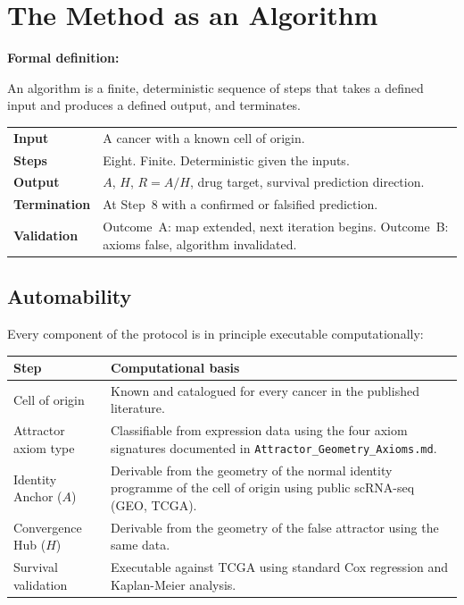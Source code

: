 \documentclass[11pt, a4paper]{article}
\begin{document}
\section{The Method as an Algorithm}

\begin{mdframed}[backgroundcolor=algorithmbox,
                 linecolor=purple!40!black,
                 linewidth=1pt]
\textbf{Formal definition:}

An algorithm is a finite, deterministic sequence of steps
that takes a defined input and produces a defined output,
and terminates.

\medskip
\begin{tabular}{p{3cm}p{10cm}}
\toprule
\textbf{Input} &
A cancer with a known cell of origin.\\[0.3em]
\textbf{Steps} &
Eight. Finite. Deterministic given the inputs.\\[0.3em]
\textbf{Output} &
$A$, $H$, $R=A/H$, drug target,
survival prediction direction.\\[0.3em]
\textbf{Termination} &
At Step~8 with a confirmed or falsified prediction.\\[0.3em]
\textbf{Validation} &
Outcome~A: map extended, next iteration begins.
Outcome~B: axioms false, algorithm invalidated.\\
\bottomrule
\end{tabular}
\end{mdframed}

\subsection{Automability}

Every component of the protocol is in principle executable
computationally:

\begin{center}
\begin{tabular}{p{4cm}p{9cm}}
\toprule
\textbf{Step} & \textbf{Computational basis} \\
\midrule
Cell of origin &
Known and catalogued for every cancer in the published
literature. \\[0.3em]
Attractor axiom type &
Classifiable from expression data using the four axiom
signatures documented in
\texttt{Attractor\_Geometry\_Axioms.md}. \\[0.3em]
Identity Anchor ($A$) &
Derivable from the geometry of the normal identity
programme of the cell of origin using public scRNA-seq
(GEO, TCGA). \\[0.3em]
Convergence Hub ($H$) &
Derivable from the geometry of the false attractor
using the same data. \\[0.3em]
Survival validation &
Executable against TCGA using standard Cox regression
and Kaplan-Meier analysis. \\
\bottomrule
\end{tabular}
\end{center}
\end{document}
